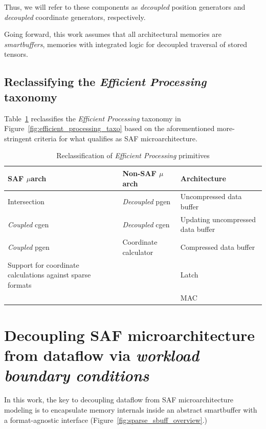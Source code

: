 Thus, we will refer to these components as \textit{decoupled} position generators and \textit{decoupled} coordinate generators, respectively.

Going forward, this work assumes that all architectural memories are \textit{smartbuffers}\cite{smartbuffer}, memories with integrated logic for decoupled traversal of stored tensors.

\subsection{Reclassifying the \textit{Efficient Processing} taxonomy}

Table~\ref{tab:reclassify_saf_microarchitecture} reclassifies the \textit{Efficient Processing} taxonomy in Figure~\ref{fig:efficient_processing_taxo} based on the aforementioned more-stringent criteria for what qualifies as SAF microarchitecture.

\begin{table}
\centering
\caption{Reclassification of \textit{Efficient Processing}\cite{szebook} primitives}
\label{tab:reclassify_saf_microarchitecture}
\begin{tabular}{||p{}|l|l||}\hline
\textbf{SAF $\mu$arch} & \textbf{Non-SAF $\mu$arch} & \textbf{Architecture}  \\\hline
Intersection & \textit{Decoupled} pgen & Uncompressed data buffer \\\hline
\textit{Coupled} cgen & \textit{Decoupled} cgen & Updating uncompressed data buffer \\\hline
\textit{Coupled} pgen & Coordinate calculator & Compressed data buffer \\\hline
Support for coordinate calculations against sparse formats &  & Latch \\\hline
 &  & MAC \\\hline
\end{tabular}
\end{table}



\section{Decoupling SAF microarchitecture from dataflow via \textit{workload boundary conditions}}

In this work, the key to decoupling dataflow from SAF microarchitecture modeling is to encapsulate memory internals inside an abstract smartbuffer with a format-agnostic interface (Figure~\ref{fig:sparse_sbuff_overview}.) 

